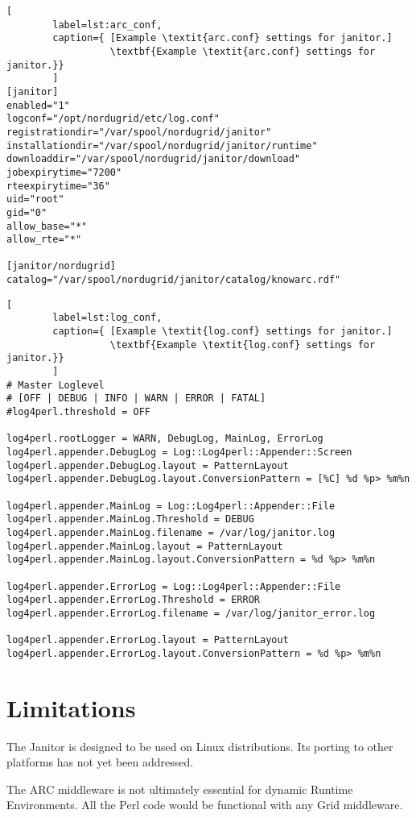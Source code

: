 \begin{lstlisting}[
        label=lst:arc_conf,
        caption={ [Example \textit{arc.conf} settings for janitor.]
                  \textbf{Example \textit{arc.conf} settings for janitor.}}
        ]
[janitor]
enabled="1"
logconf="/opt/nordugrid/etc/log.conf"
registrationdir="/var/spool/nordugrid/janitor"
installationdir="/var/spool/nordugrid/janitor/runtime"
downloaddir="/var/spool/nordugrid/janitor/download"
jobexpirytime="7200"
rteexpirytime="36"
uid="root"
gid="0"
allow_base="*"
allow_rte="*"

[janitor/nordugrid]
catalog="/var/spool/nordugrid/janitor/catalog/knowarc.rdf"
\end{lstlisting}

\begin{lstlisting}[
        label=lst:log_conf,
        caption={ [Example \textit{log.conf} settings for janitor.]
                  \textbf{Example \textit{log.conf} settings for janitor.}}
        ]
# Master Loglevel
# [OFF | DEBUG | INFO | WARN | ERROR | FATAL]
#log4perl.threshold = OFF

log4perl.rootLogger = WARN, DebugLog, MainLog, ErrorLog
log4perl.appender.DebugLog = Log::Log4perl::Appender::Screen
log4perl.appender.DebugLog.layout = PatternLayout
log4perl.appender.DebugLog.layout.ConversionPattern = [%C] %d %p> %m%n

log4perl.appender.MainLog = Log::Log4perl::Appender::File
log4perl.appender.MainLog.Threshold = DEBUG
log4perl.appender.MainLog.filename = /var/log/janitor.log
log4perl.appender.MainLog.layout = PatternLayout
log4perl.appender.MainLog.layout.ConversionPattern = %d %p> %m%n

log4perl.appender.ErrorLog = Log::Log4perl::Appender::File
log4perl.appender.ErrorLog.Threshold = ERROR
log4perl.appender.ErrorLog.filename = /var/log/janitor_error.log

log4perl.appender.ErrorLog.layout = PatternLayout
log4perl.appender.ErrorLog.layout.ConversionPattern = %d %p> %m%n
\end{lstlisting}



\section{Limitations}

The Janitor is designed to be used on Linux distributions.
Its porting to other platforms has not yet been addressed.

The ARC middleware is not ultimately essential for dynamic Runtime Environments.
All the Perl code would be functional with any Grid middleware.

